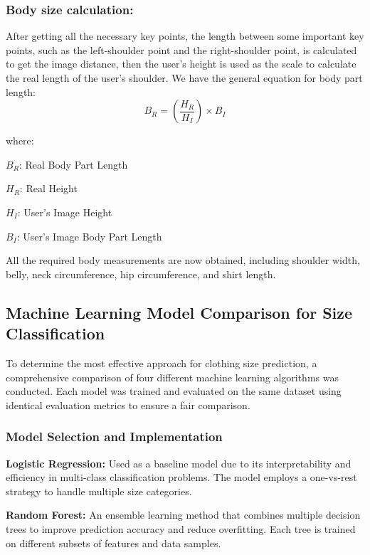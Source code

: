 \documentclass{llncs}
\begin{document}
\subsubsection{Body size calculation:}
After getting all the necessary key points, the length between some important key points, such as the left-shoulder point and the right-shoulder point, 
    is calculated to get the image distance, then the user's height is used as the scale to calculate the real length of the user’s shoulder. 
We have the general equation for body part length:
\begin{equation}
B_R = \left(\frac{H_R}{H_I}\right) \times B_I
\end{equation}

where:

\hspace*{2em} $B_R$: Real Body Part Length

\hspace*{2em} $H_R$: Real Height

\hspace*{2em} $H_I$: User's Image Height

\hspace*{2em} $B_I$: User's Image Body Part Length

All the required body measurements are now obtained, including shoulder width, belly, neck circumference, hip circumference, and shirt length.

\subsection{Machine Learning Model Comparison for Size Classification}

To determine the most effective approach for clothing size prediction, a comprehensive comparison of four different machine learning algorithms was conducted. 
Each model was trained and evaluated on the same dataset using identical evaluation metrics to ensure a fair comparison.
\subsubsection{Model Selection and Implementation} 



\textbf{Logistic Regression:} Used as a baseline model due to its interpretability and efficiency in multi-class classification problems. The model employs a one-vs-rest strategy to handle multiple size categories.

\textbf{Random Forest:} An ensemble learning method that combines multiple decision trees to improve prediction accuracy and reduce overfitting. Each tree is trained on different subsets of features and data samples.
\end{document}

